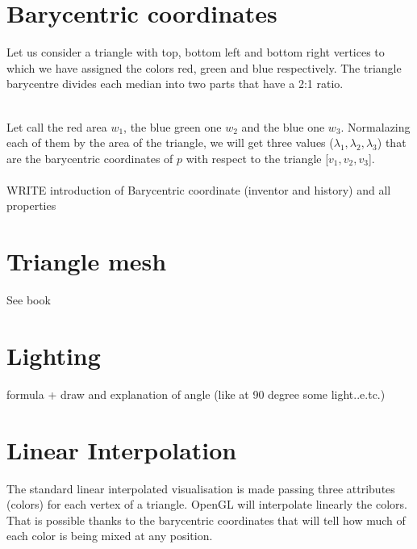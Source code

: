 \section{Barycentric coordinates}
Let us consider a triangle with top, bottom left and bottom right vertices to which we have assigned the colors red, green and blue respectively. The triangle barycentre divides each median into two parts that have a 2:1 ratio. \\
    \\
    Let call the red area $w_1$, the blue green one $w_2$ and the blue one $w_3$. Normalazing each of them by the area of the triangle, we will get three values ($\lambda_1, \lambda_2, \lambda_3$) that are the barycentric coordinates of $p$ with respect to the triangle [$v_1, v_2, v_3$].
\\ \\ WRITE introduction of Barycentric coordinate (inventor and history) and all properties

\section{Triangle mesh}
See book


\section{Lighting}
formula + draw and explanation of angle (like at 90 degree some light..e.tc.)

\section{Linear Interpolation}
The standard linear interpolated visualisation is made passing three attributes (colors) for each vertex of a triangle. OpenGL will interpolate linearly the colors. That is possible thanks to the barycentric coordinates that will tell how much of each color is being mixed at any position.


